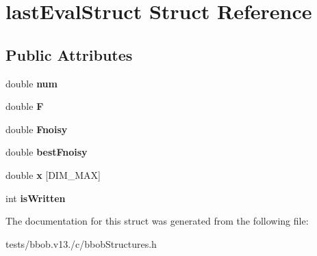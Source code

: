 \hypertarget{structlastEvalStruct}{\section{last\-Eval\-Struct Struct Reference}
\label{structlastEvalStruct}
}
\subsection*{Public Attributes}
\begin{DoxyCompactItemize}
\item 
\hypertarget{structlastEvalStruct_af5d431dd701c9bde0f8ad17b6506b2a3}{double {\bfseries num}}\label{structlastEvalStruct_af5d431dd701c9bde0f8ad17b6506b2a3}

\item 
\hypertarget{structlastEvalStruct_a83d6911bc9e5d20dc0eb02efd2bbc8d4}{double {\bfseries F}}\label{structlastEvalStruct_a83d6911bc9e5d20dc0eb02efd2bbc8d4}

\item 
\hypertarget{structlastEvalStruct_a22eb9ca20e6bc5a1f9da1b1daf0d81b3}{double {\bfseries Fnoisy}}\label{structlastEvalStruct_a22eb9ca20e6bc5a1f9da1b1daf0d81b3}

\item 
\hypertarget{structlastEvalStruct_aeefddf8f3a9a0c45f9cf4592338591d9}{double {\bfseries best\-Fnoisy}}\label{structlastEvalStruct_aeefddf8f3a9a0c45f9cf4592338591d9}

\item 
\hypertarget{structlastEvalStruct_a4de4d9e0b5854b52e1c03c935fcf19ed}{double {\bfseries x} \mbox{[}D\-I\-M\-\_\-\-M\-A\-X\mbox{]}}\label{structlastEvalStruct_a4de4d9e0b5854b52e1c03c935fcf19ed}

\item 
\hypertarget{structlastEvalStruct_a7fccf05ddaf98c80df3175f388900746}{int {\bfseries is\-Written}}\label{structlastEvalStruct_a7fccf05ddaf98c80df3175f388900746}

\end{DoxyCompactItemize}


The documentation for this struct was generated from the following file\-:\begin{DoxyCompactItemize}
\item 
tests/bbob.\-v13./c/bbob\-Structures.\-h\end{DoxyCompactItemize}
